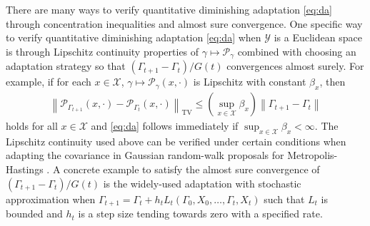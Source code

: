 \documentclass[12pt]{article}
\theoremstyle{plain}
\theoremstyle{remark}
\newcommand{\norm}[1]{\left\lVert#1\right\rVert}
\renewcommand{\P}{\mathcal{P}}
\newcommand{\X}{\mathcal{X}}
\newcommand{\Y}{\mathcal{Y}}
\begin{document}
There are many ways to verify quantitative diminishing adaptation \eqref{eq:da} through concentration inequalities and almost sure convergence.
One specific way to verify quantitative diminishing adaptation \eqref{eq:da} when $\Y$ is a Euclidean space is through Lipschitz continuity properties of $\gamma \mapsto \P_\gamma$ combined with choosing an adaptation strategy so that $( \Gamma_{t + 1} - \Gamma_t ) / G(t)$ convergences almost surely. 
For example, if for each $x \in \X$, $\gamma \mapsto \P_{\gamma}(x, \cdot)$ is Lipschitz with constant $\beta_x$, then
\begin{align*}
\norm{\P_{\Gamma_{t + 1}}(x, \cdot) - \P_{\Gamma_t}(x, \cdot)}_{\text{TV}}
\le \left( \sup_{x \in \X} \beta_x \right) \norm{ \Gamma_{t + 1} - \Gamma_t}
\end{align*}
holds for all $x \in \X$ and \eqref{eq:da} follows immediately if $\sup_{x \in \X} \beta_x < \infty$.
The Lipschitz continuity used above can be verified under certain conditions when adapting the covariance in Gaussian random-walk proposals for Metropolis-Hastings \citep{andrieu:moulines:2006}.
A concrete example to satisfy the almost sure convergence of $( \Gamma_{t + 1} - \Gamma_t ) / G(t)$ is the widely-used adaptation with stochastic approximation when $\Gamma_{t + 1} = \Gamma_t + h_{t} L_t(\Gamma_0, X_0, \ldots, \Gamma_{t}, X_t)$ such that $L_t$ is bounded and $h_{t}$ is a step size tending towards zero with a specified rate.
\end{document}
